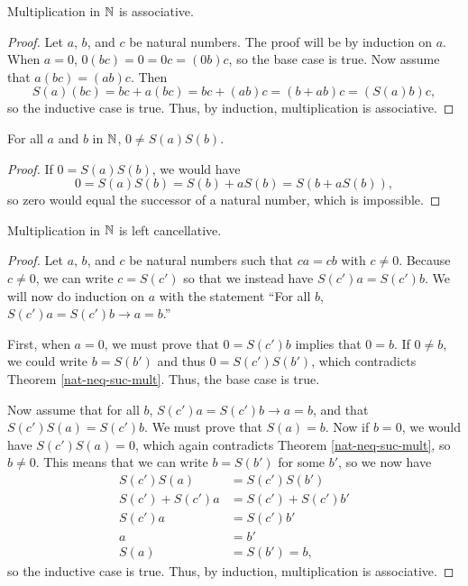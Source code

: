 \documentclass[../math.tex]{subfiles}
\begin{document}
\begin{instance}
    Multiplication in $\mathbb{N}$ is associative.
\end{instance}
\begin{proof}
    Let $a$, $b$, and $c$ be natural numbers.  The proof will be by induction on
    $a$.  When $a = 0$, $0(bc) = 0 = 0c = (0b)c$, so the base case is true.  Now
    assume that $a(bc) = (ab)c$.  Then
    \[
        S(a)(bc) = bc + a(bc) = bc + (ab)c = (b + ab)c = (S(a)b)c,
    \]
    so the inductive case is true.  Thus, by induction, multiplication is
    associative.
\end{proof}

\begin{theorem} \label{nat-neq-suc-mult}
    For all $a$ and $b$ in $\mathbb{N}$, $0 \neq S(a)S(b)$.
\end{theorem}
\begin{proof}
    If $0 = S(a)S(b)$, we would have
    \[
        0 = S(a)S(b) = S(b) + aS(b) = S(b + aS(b)),
    \]
    so zero would equal the successor of a natural number, which is impossible.
\end{proof}

\begin{instance}
    Multiplication in $\mathbb{N}$ is left cancellative.
\end{instance}
\begin{proof}
    Let $a$, $b$, and $c$ be natural numbers such that $ca = cb$ with $c \neq
    0$.  Because $c \neq 0$, we can write $c = S(c')$ so that we instead have
    $S(c')a = S(c')b$.  We will now do induction on $a$ with the statement ``For
    all $b$, $S(c')a = S(c')b \rightarrow a = b$.''

    First, when $a = 0$, we must prove that $0 = S(c')b$ implies that $0 = b$.
    If $0 \neq b$, we could write $b = S(b')$ and thus $0 = S(c')S(b')$, which
    contradicts Theorem \ref{nat-neq-suc-mult}.  Thus, the base case is true.

    Now assume that for all $b$, $S(c')a = S(c')b \rightarrow a = b$, and that
    $S(c')S(a) = S(c')b$.  We must prove that $S(a) = b$.  Now if $b = 0$, we
    would have $S(c')S(a) = 0$, which again contradicts Theorem
    \ref{nat-neq-suc-mult}, so $b \neq 0$.  This means that we can write $b =
    S(b')$ for some $b'$, so we now have
    \begin{align*}
        S(c')S(a) &= S(c')S(b') \\
        S(c') + S(c')a &= S(c') + S(c')b' \\
        S(c')a &= S(c')b' \\
        a &= b' \\
        S(a) &= S(b') = b,
    \end{align*}
    so the inductive case is true.  Thus, by induction, multiplication is
    associative.
\end{proof}
\end{document}
